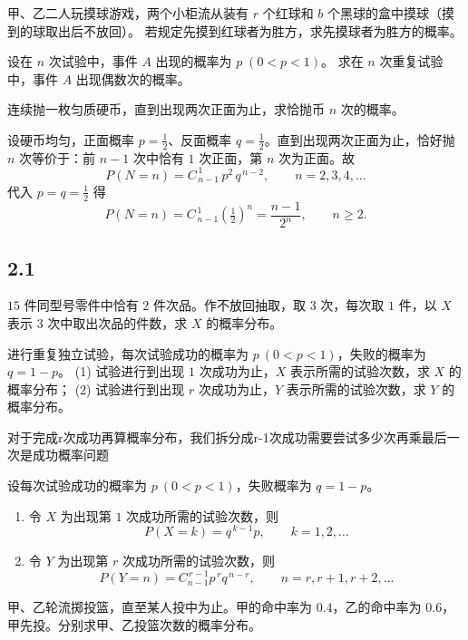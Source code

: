 \begin{exercise}
甲、乙二人玩摸球游戏，两个小柜流从装有 $r$ 个红球和 $b$ 个黑球的盒中摸球（摸到的球取出后不放回）。
若规定先摸到红球者为胜方，求先摸球者为胜方的概率。
\end{exercise}

\begin{exercise}
设在 $n$ 次试验中，事件 $A$ 出现的概率为 $p\;(0<p<1)$。
求在 $n$ 次重复试验中，事件 $A$ 出现偶数次的概率。
\end{exercise}

\begin{exercise}
连续抛一枚匀质硬币，直到出现两次正面为止，求恰抛币 $n$ 次的概率。
\end{exercise}\begin{solution}[解答 1.36]
设硬币均匀，正面概率 $p=\tfrac12$、反面概率 $q=\tfrac12$。直到出现两次正面为止，恰好抛 $n$ 次等价于：前 $n-1$ 次中恰有 $1$ 次正面，第 $n$ 次为正面。故
\[
P(N=n)=C_{\,n-1}^{\,1}\,p^{2}\,q^{\,n-2},\qquad n=2,3,4,\dots
\]
代入 $p=q=\tfrac12$ 得
\[
P(N=n)=C_{\,n-1}^{\,1}\left(\tfrac12\right)^{n}
=\frac{n-1}{2^{n}},\qquad n\ge 2.
\]
\end{solution}
\subsection*{2.1}
\begin{homework}[2.3]
$15$ 件同型号零件中恰有 $2$ 件次品。作不放回抽取，取 $3$ 次，每次取 $1$ 件，以 $X$ 表示 $3$ 次中取出次品的件数，求 $X$ 的概率分布。
\end{homework}

\begin{homework}[2.4]
进行重复独立试验，每次试验成功的概率为 $p \ (0 < p < 1)$，失败的概率为 $q = 1 - p$。  
(1) 试验进行到出现 $1$ 次成功为止，$X$ 表示所需的试验次数，求 $X$ 的概率分布；  
(2) 试验进行到出现 $r$ 次成功为止，$Y$ 表示所需的试验次数，求 $Y$ 的概率分布。
\end{homework}
\begin{dxtips}
    对于完成r次成功再算概率分布，我们拆分成r-1次成功需要尝试多少次再乘最后一次是成功概率问题
\end{dxtips}
\begin{solution}
设每次试验成功的概率为 $p\ (0<p<1)$，失败概率为 $q=1-p$。

\begin{enumerate}[(1)]
  \item 令 $X$ 为出现第 $1$ 次成功所需的试验次数，则
  \[
    P(X=k)=q^{\,k-1}p,\qquad k=1,2,\dots
  \]

  \item 令 $Y$ 为出现第 $r$ 次成功所需的试验次数，则
 \[
P(Y=n)=C_{n-1}^{\,r-1} p^{\,r} q^{\,n-r},\qquad n=r,r+1,r+2,\dots
\]
\end{enumerate}
\end{solution}
\begin{homework}[2.5]
甲、乙轮流掷投篮，直至某人投中为止。甲的命中率为 $0.4$，乙的命中率为 $0.6$，甲先投。分别求甲、乙投篮次数的概率分布。
\end{homework}

